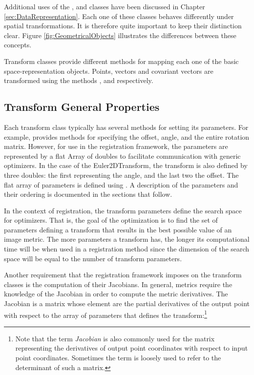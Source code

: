 Additional uses of the ,  and
 classes have been discussed in Chapter
\ref{sec:DataRepresentation}.  Each one of these classes behaves differently
under spatial transformations. It is therefore quite important to keep their
distinction clear. Figure
\ref{fig:GeometricalObjects} illustrates the differences between
these concepts.



Transform classes provide different methods for mapping each one of
the basic space-representation objects.  Points, vectors and covariant vectors
are transformed using the methods ,
 and  respectively.

\subsection{Transform General Properties}
\label{sec:TransformGeneralProperties}

 Each transform class typically has
several methods for setting its parameters.  For example,
 provides methods for specifying the offset,
angle, and the entire rotation matrix.  However, for use in the
registration framework, the parameters are represented by a flat
Array of doubles to facilitate communication with generic
optimizers. In the case of the Euler2DTransform, the transform is also
defined by three doubles: the first representing the angle, and the last two the
offset. The flat array of parameters is defined using . A
description of the parameters and their ordering is documented in the 
sections that follow.
 
In the context of registration, the transform parameters define the search
space for optimizers. That is, the goal of the optimization is to find the set
of parameters defining a transform that results in the best possible value of
an image metric. The more parameters a transform has, the longer its
computational time will be when used in a registration method since the
dimension of the search space will be equal to the number of transform
parameters.


Another requirement that the registration framework imposes on the transform
classes is the computation of their Jacobians. In general, metrics require
the knowledge of the Jacobian in order to compute the metric derivatives.
The Jacobian is a matrix whose element are the partial derivatives of the
output point with respect to the array of parameters that defines the
transform:\footnote{Note that the term \emph{Jacobian} is also commonly used
for the matrix representing the derivatives of output point coordinates with
respect to input point coordinates. Sometimes the term is loosely used to
refer to the determinant of such a matrix.}

